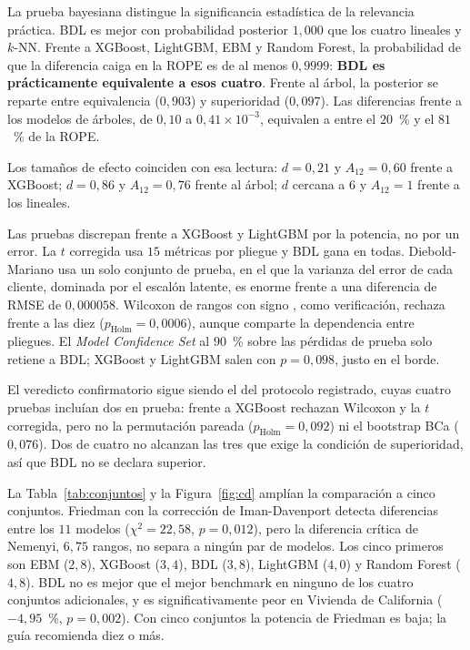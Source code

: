 La prueba bayesiana distingue la significancia estadística de la relevancia práctica. BDL es mejor con probabilidad
posterior $1{,}000$ que los cuatro lineales y $k$-NN. Frente a XGBoost, LightGBM, EBM y Random Forest, la probabilidad
de que la diferencia caiga en la ROPE es de al menos $0{,}9999$: \textbf{BDL es prácticamente equivalente a esos
cuatro}. Frente al árbol, la posterior se reparte entre equivalencia ($0{,}903$) y superioridad ($0{,}097$). Las
diferencias frente a los modelos de árboles, de $0{,}10$ a $0{,}41 \times 10^{-3}$, equivalen a entre el $20$~\% y el
$81$~\% de la ROPE.

Los tamaños de efecto coinciden con esa lectura: $d=0{,}21$ y $A_{12}=0{,}60$ frente a XGBoost; $d=0{,}86$ y
$A_{12}=0{,}76$ frente al árbol; $d$ cercana a $6$ y $A_{12}=1$ frente a los lineales.

Las pruebas discrepan frente a XGBoost y LightGBM por la potencia, no por un error. La $t$ corregida usa $15$
métricas por pliegue y BDL gana en todas. Diebold-Mariano usa un solo conjunto de prueba, en el que la varianza del
error de cada cliente, dominada por el escalón latente, es enorme frente a una diferencia de RMSE de $0{,}000058$.
Wilcoxon de rangos con signo \citep{wilcoxon1945}, como verificación, rechaza frente a las diez
($p_{\mathrm{Holm}}=0{,}0006$), aunque comparte la dependencia entre pliegues. El \emph{Model Confidence Set}
\citep{hansen2011mcs} al $90$~\% sobre las pérdidas de prueba solo retiene a BDL; XGBoost y LightGBM salen con
$p=0{,}098$, justo en el borde.

El veredicto confirmatorio sigue siendo el del protocolo registrado, cuyas cuatro pruebas incluían dos en prueba:
frente a XGBoost rechazan Wilcoxon y la $t$ corregida, pero no la permutación pareada ($p_{\mathrm{Holm}}=0{,}092$) ni
el bootstrap BCa ($0{,}076$). Dos de cuatro no alcanzan las tres que exige la condición de superioridad, así que BDL
no se declara superior.



La Tabla~\ref{tab:conjuntos} y la Figura~\ref{fig:cd} amplían la comparación a cinco conjuntos. Friedman con la
corrección de Iman-Davenport \citep{demsar2006,iman1980} detecta diferencias entre los $11$ modelos ($\chi^2=22{,}58$,
$p=0{,}012$), pero la diferencia crítica de Nemenyi, $6{,}75$ rangos, no separa a ningún par de modelos. Los cinco
primeros son EBM ($2{,}8$), XGBoost ($3{,}4$), BDL ($3{,}8$), LightGBM ($4{,}0$) y Random Forest ($4{,}8$). BDL no es
mejor que el mejor benchmark en ninguno de los cuatro conjuntos adicionales, y es significativamente peor en Vivienda
de California ($-4{,}95$~\%, $p=0{,}002$). Con cinco conjuntos la potencia de Friedman es baja; la guía recomienda
diez o más.

